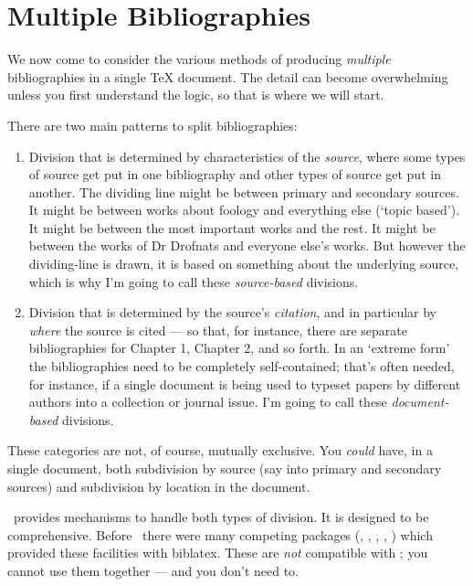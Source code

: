 \chapter{Multiple Bibliographies}\label{ch:subdivisions}

We now come to consider the various methods of producing
\emph{multiple} bibliographies in a single TeX document. The detail
can become overwhelming unless you first understand the logic, so that
is where we will start.

There are two main patterns to split bibliographies:

\begin{enumerate}
\item Division that is determined by characteristics of the
  \emph{source}, where some types of source get put in one bibliography
  and other types of source get put in another. The dividing line
  might be between primary and secondary sources. It might be between
  works about foology and everything else (`topic based'). It might
  be between the most important works and the rest. It might be
  between the works of Dr Drofnats and everyone else's works. But
  however the dividing-line is drawn, it is based on something about
  the underlying source, which is why I'm going to call these
  \emph{source-based} divisions.
\item Division that is determined by the source's \emph{citation}, and
  in particular by \emph{where} the source is cited --- so that, for
  instance, there are separate bibliographies for Chapter 1, Chapter
  2, and so forth. In an `extreme form' the bibliographies need to
  be completely self-contained; that's often needed, for instance, if
  a single document is being used to typeset papers by different
  authors into a collection or journal issue. I'm going to call these
  \emph{document-based} divisions.
\end{enumerate}
These categories are not, of course, mutually exclusive. You
\emph{could} have, in a single document, both subdivision by source
(say into primary and secondary sources) and subdivision by location
in the document.

\biblatex\ provides mechanisms to handle both types of division. It is
designed to be comprehensive. Before \biblatex\ there were many
competing packages (, ,
, , ) which
provided these facilities with biblatex. These are \emph{not}
compatible with \biblatex; you cannot use them together --- and you
don't need to.

